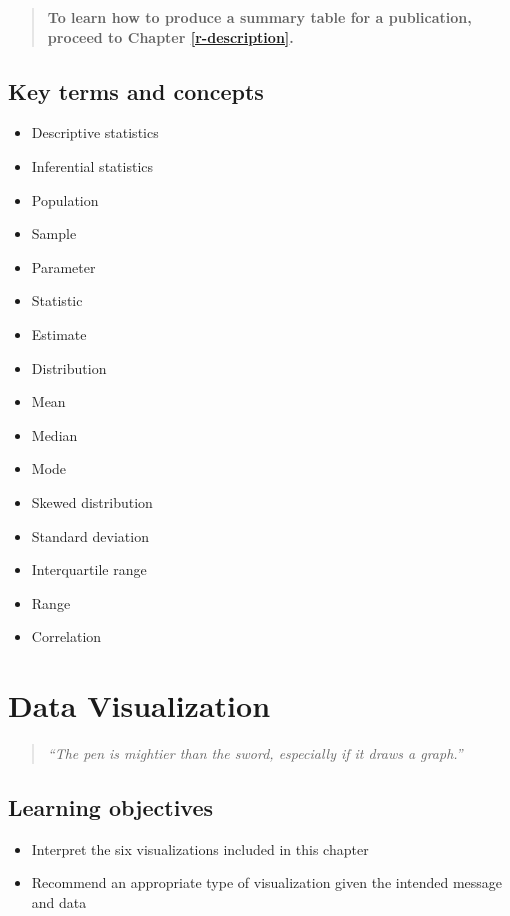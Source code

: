 \documentclass[
]{book}
\providecommand{\tightlist}{%
  \setlength{\itemsep}{0pt}\setlength{\parskip}{0pt}}
\newenvironment{learncheck}%
{%
  \par\vspace{\baselineskip}\noindent 
  \color{Exercise}\begin{itshape}%
  \par\vspace{\baselineskip}\noindent\ignorespaces 
}%
{%
  \end{itshape}\ignorespacesafterend 
}
\begin{document}
\begin{quote}
\textbf{To learn how to produce a summary table for a publication, proceed to Chapter \ref{r-description}.}
\end{quote}

\hypertarget{kt4}{%
\section{Key terms and concepts}\label{kt4}}

\begin{learncheck}
\begin{itemize}
\tightlist
\item
  Descriptive statistics
\item
  Inferential statistics
\item
  Population
\item
  Sample
\item
  Parameter
\item
  Statistic
\item
  Estimate
\item
  Distribution
\item
  Mean
\item
  Median
\item
  Mode
\item
  Skewed distribution
\item
  Standard deviation
\item
  Interquartile range
\item
  Range
\item
  Correlation
\end{itemize}
\end{learncheck}

\hypertarget{data-visualization}{%
\chapter{Data Visualization}\label{data-visualization}}

\begin{quote}
\emph{``The pen is mightier than the sword, especially if it draws a graph.''}
\end{quote}

\hypertarget{lo5}{%
\section{Learning objectives}\label{lo5}}

\begin{learncheck}
\begin{itemize}
\tightlist
\item
  Interpret the six visualizations included in this chapter
\item
  Recommend an appropriate type of visualization given the intended
  message and data
\end{itemize}
\end{learncheck}
\end{document}
